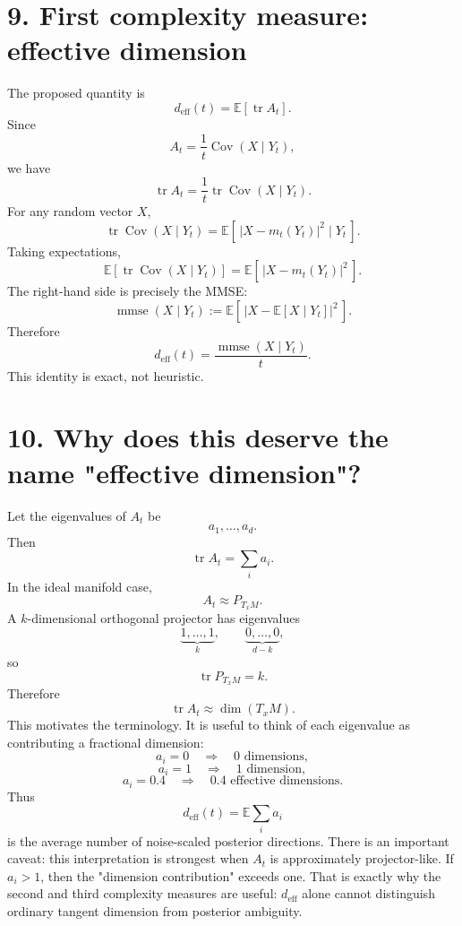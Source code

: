 \documentclass{article}
\begin{document}
\section*{9. First complexity measure: effective dimension}
The proposed quantity is
\[
\boxed{
d_{\mathrm{eff}}(t) = \mathbb E[\operatorname{tr}A_t].
}
\]
Since
\[
A_t = \frac1t\operatorname{Cov}(X\mid Y_t),
\]
we have
\[
\operatorname{tr}A_t = \frac1t \operatorname{tr}\operatorname{Cov}(X\mid Y_t).
\]
For any random vector $X$,
\[
\operatorname{tr}\operatorname{Cov}(X\mid Y_t) = \mathbb E[\,|X-m_t(Y_t)|^2 \mid Y_t\,].
\]
Taking expectations,
\[
\mathbb E[\operatorname{tr} \operatorname{Cov}(X\mid Y_t)] = \mathbb E[\,|X-m_t(Y_t)|^2\,].
\]
The right-hand side is precisely the MMSE:
\[
\operatorname{mmse}(X\mid Y_t) := \mathbb E[\,|X-\mathbb E[X\mid Y_t]|^2\,].
\]
Therefore
\[
\boxed{
d_{\mathrm{eff}}(t) = \frac{\operatorname{mmse}(X\mid Y_t)}{t}.
}
\]
This identity is exact, not heuristic.

\section*{10. Why does this deserve the name "effective dimension"?}
Let the eigenvalues of $A_t$ be
\[
a_1,\ldots,a_d.
\]
Then
\[
\operatorname{tr}A_t = \sum_i a_i.
\]
In the ideal manifold case,
\[
A_t \approx P_{T_xM}.
\]
A $k$-dimensional orthogonal projector has eigenvalues
\[
\underbrace{1,\ldots,1}_{k}, \qquad \underbrace{0,\ldots,0}_{d-k},
\]
so
\[
\operatorname{tr}P_{T_xM} = k.
\]
Therefore
\[
\boxed{
\operatorname{tr}A_t \approx \dim(T_xM).
}
\]
This motivates the terminology.
It is useful to think of each eigenvalue as contributing a fractional dimension:
\[
a_i = 0 \quad\Rightarrow\quad 0\text{ dimensions},
\]
\[
a_i = 1 \quad\Rightarrow\quad 1\text{ dimension},
\]
\[
a_i = 0.4 \quad\Rightarrow\quad 0.4\text{ effective dimensions}.
\]
Thus
\[
d_{\mathrm{eff}}(t) = \mathbb E\sum_i a_i
\]
is the average number of noise-scaled posterior directions.
There is an important caveat: this interpretation is strongest when $A_t$ is approximately projector-like. If $a_i > 1$, then the "dimension contribution" exceeds one. That is exactly why the second and third complexity measures are useful: $d_{\mathrm{eff}}$ alone cannot distinguish ordinary tangent dimension from posterior ambiguity.
\end{document}
